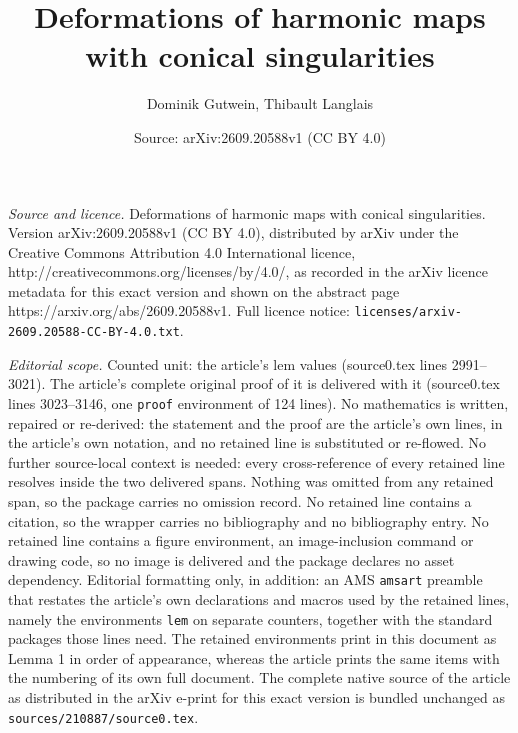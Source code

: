 \documentclass[10pt,a4paper]{amsart}
\title{Deformations of harmonic maps with conical singularities}
\author{Dominik Gutwein, Thibault Langlais}
\date{Source: arXiv:2609.20588v1 (CC BY 4.0)}
\begin{document}
\maketitle

\noindent\emph{Source and licence.} Deformations of harmonic maps with conical singularities. Version arXiv:2609.20588v1 (CC BY 4.0), distributed by arXiv under the Creative Commons Attribution 4.0 International licence, http://creativecommons.org/licenses/by/4.0/, as recorded in the arXiv licence metadata for this exact version and shown on the abstract page https://arxiv.org/abs/2609.20588v1. Full licence notice: \texttt{licenses/arxiv-2609.20588-CC-BY-4.0.txt}.\par\smallskip

\noindent\textit{Editorial scope.} Counted unit: the article's lem values (source0.tex lines 2991--3021). The article's complete original proof of it is delivered with it (source0.tex lines 3023--3146, one \texttt{proof} environment of 124 lines). No mathematics is written, repaired or re-derived: the statement and the proof are the article's own lines, in the article's own notation, and no retained line is substituted or re-flowed.  No further source-local context is needed: every cross-reference of every retained line resolves inside the two delivered spans.  Nothing was omitted from any retained span, so the package carries no omission record.  No retained line contains a citation, so the wrapper carries no bibliography and no bibliography entry.  No retained line contains a figure environment, an image-inclusion command or drawing code, so no image is delivered and the package declares no asset dependency.  Editorial formatting only, in addition: an AMS \texttt{amsart} preamble that restates the article's own declarations and macros used by the retained lines, namely the environments \texttt{lem} on separate counters, together with the standard packages those lines need.  The retained environments print in this document as Lemma 1 in order of appearance, whereas the article prints the same items with the numbering of its own full document.  The complete native source of the article as distributed in the arXiv e-print for this exact version is bundled unchanged as \texttt{sources/210887/source0.tex}.
\end{document}
